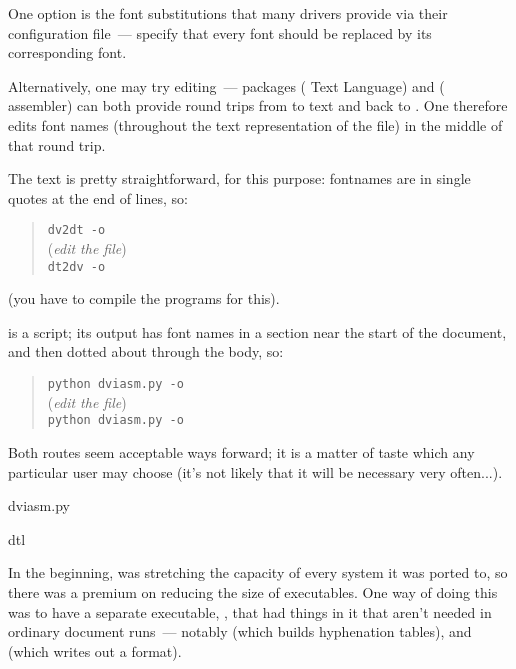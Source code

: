 One option is the font substitutions that many
 drivers provide via their configuration file~---
specify that every  font should be replaced by its
corresponding  font.

Alternatively, one may try  editing~--- packages
 ( Text Language) and 
( assembler) can both provide round trips from  to
text and back to .  One therefore edits font names
(throughout the text representation of the file) in the middle of that
round trip.

The  text is pretty straightforward, for this purpose:
fontnames are in single quotes at the end of lines, so:
\begin{quote}
  \texttt{dv2dt -o}  \\
  (\emph{edit the  file})\\
  \texttt{dt2dv -o}  
\end{quote}
(you have to compile the  programs for this).

 is a  script; its output has font
names in a section near the start of the document, and then dotted
about through the body, so:
\begin{quote}
  \texttt{python dviasm.py -o}  \\
  (\emph{edit the  file})\\
  \texttt{python dviasm.py -o}  
\end{quote}
Both routes seem acceptable ways forward; it is a matter of taste
which any particular user may choose (it's not likely that it will be
necessary very often...).
\begin{ctanrefs}
\item[dviasm.py]
\item[dtl]
\end{ctanrefs}


In the beginning, \AllTeX{} was stretching the capacity of every
system it was ported to, so there was a premium on reducing the size
of executables.  One way of doing this was to have a separate
executable, , that had things in it that aren't
needed in ordinary document runs~--- notably  (which
builds hyphenation tables), and  (which writes out a format).

